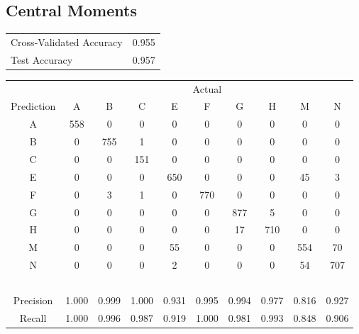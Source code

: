 \documentclass[12pt]{article}
\begin{document}
\newpage
{}

\subsection*{Central Moments}
\begin{center}
	\begin{tabular}{l|c}
	Cross-Validated Accuracy & 0.955\\
	Test Accuracy & 0.957\\
	\end{tabular}

\vspace{1em}

    \begin{tabular}{c|ccccccccc}
	& \multicolumn{9}{c}{Actual} \\ 
     Prediction         & A     & B     & C     & E     & F     & G     & H     & M     & N     \\ \hline
    A         & 558   & 0     & 0     & 0     & 0     & 0     & 0     & 0     & 0     \\
    B         & 0     & 755   & 1     & 0     & 0     & 0     & 0     & 0     & 0     \\
    C         & 0     & 0     & 151   & 0     & 0     & 0     & 0     & 0     & 0     \\
    E         & 0     & 0     & 0     & 650   & 0     & 0     & 0     & 45    & 3     \\
    F         & 0     & 3     & 1     & 0     & 770   & 0     & 0     & 0     & 0     \\
    G         & 0     & 0     & 0     & 0     & 0     & 877   & 5     & 0     & 0     \\
    H         & 0     & 0     & 0     & 0     & 0     & 17    & 710   & 0     & 0     \\
    M         & 0     & 0     & 0     & 55    & 0     & 0     & 0     & 554   & 70    \\
    N         & 0     & 0     & 0     & 2     & 0     & 0     & 0     & 54    & 707   \\
    ~         & ~     & ~     & ~     & ~     & ~     & ~     & ~     & ~     & ~     \\
    Precision & 1.000 & 0.999 & 1.000 & 0.931 & 0.995 & 0.994 & 0.977 & 0.816 & 0.927 \\
    Recall    & 1.000 & 0.996 & 0.987 & 0.919 & 1.000 & 0.981 & 0.993 & 0.848 & 0.906 \\
    \end{tabular}
\end{center}
\end{document}
